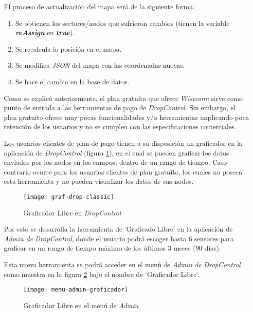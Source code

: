 El proceso de actualización del mapa será de la siguiente forma:
\begin{enumerate}
    \item Se obtienen los sectores/nodos que sufrieron cambios (tienen la variable \textbf{\textit{reAssign}} en \textbf{\textit{true}}).
    \item Se recalcula la posición en el mapa.
    \item Se modifica \textit{JSON} del mapa con las coordenadas nuevas.
    \item Se hace el cambio en la base de datos.
\end{enumerate}

\iffalse
{}

Como se explicó anteriormente, el plan gratuito que ofrece \textit{Wiseconn} sirve como punto de entrada a las herramientas
de pago de \textit{DropControl}. Sin embargo, el plan gratuito ofrece muy pocas funcionalidades y/o herramientas
implicando poca retención de los usuarios y no se cumplen con las especificaciones comerciales.

Los usuarios clientes de plan de pago tienen a su disposición un graficador en la aplicación de \textit{DropControl} (figura \ref{fig:graf-drop-classic}), en el cual
se pueden graficar los datos enviados por los nodos en los campos, dentro de un rango de tiempo.
Caso contrario ocurre para los usuarios clientes de plan gratuito, los cuales no poseen esta herramienta y
no pueden visualizar los datos de sus nodos.

\begin{figure}[H]
	\centering
	\texttt{[image: graf-drop-classic]}
	\caption{\label{fig:graf-drop-classic} Graficador Libre en \textit{DropControl}}
\end{figure}

Por esto se desarrolla la herramienta de 'Graficado Libre' en la aplicación de \textit{Admin de DropControl},
donde el usuario podrá escoger hasta 6 sensores para graficar en un rango de tiempo máximo de los últimos 3 meses (90 días).

Esta nueva herramienta se podrá acceder en el menú de \textit{Admin de DropControl} como muestra en la figura \ref{fig:menu-admin-graf1} bajo el nombre de `Graficador Libre`. 

\begin{figure}[H]
	\centering
	\texttt{[image: menu-admin-graficador]}
	\caption{\label{fig:menu-admin-graf1} Graficador Libre en el menú de \textit{Admin}}
\end{figure}

